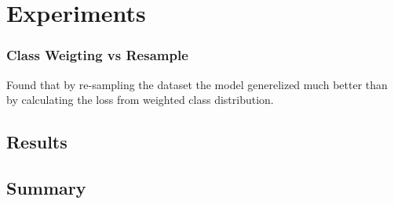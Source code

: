 \documentclass[thesis.tex]{subfiles}
\begin{document}
\chapter{Experiments} \label{chap:experiments}

\subsection{Class Weigting vs Resample}
Found that by re-sampling the dataset the model generelized much better than by calculating the loss from weighted class distribution.

\section{Results} \label{sec:C4-results}


\section{Summary} \label{sec:C4-summary}
\end{document}
